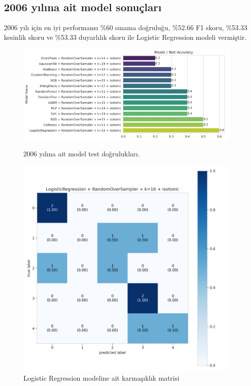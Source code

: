 \newpage

\subsection{2006 yılına ait model sonuçları}
2006 yılı için en iyi performansı \%60 sınama doğruluğu,  \%52.66 F1 skoru, \%53.33 kesinlik skoru ve \%53.33 duyarlılık skoru ile Logistic Regression modeli vermiştir.

\begin{figure}[ht]
\centering
\begin{minipage}[b]{0.7\textwidth}
    \centering
    \includegraphics[width=\textwidth]{2006.png}
    \caption{2006 yılına ait model test doğrulukları.}
    \label{fig:resim1}
\end{minipage}
\hfill
\begin{minipage}[b]{0.6\textwidth}
    \centering
    \includegraphics[width=\textwidth]{2006_cm.png}
    \caption{Logistic Regression modeline ait karmaşıklık matrisi}
    \label{fig:resim2}
\end{minipage}
\end{figure}
\newpage

